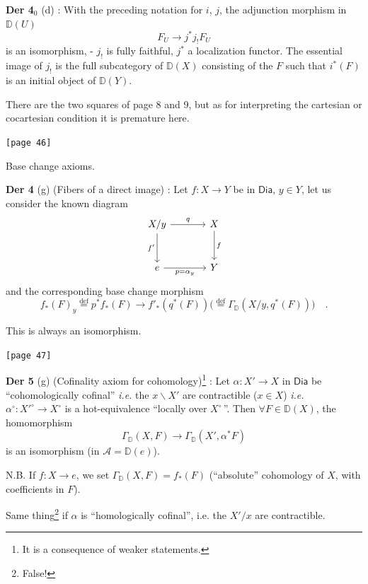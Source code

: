 \documentclass[11pt]{article}
\newcommand{\printedpage}[1]{\marginpar{\footnotesize p.~#1}}
\newcommand{\msp}[1]{\marginpar{\footnotesize [#1]}}
\newcommand{\D}{\mathbb{D}}
\newcommand{\Dia}{\mathsf{Dia}}
\begin{document}
\printedpage{25}

\noindent\textbf{Der 4}$_{0}$ (d) : With the preceding notation for $i$, $j$, the adjunction morphism in $\D(U)$
\[ F_{U} \longrightarrow j^{*} j_{!} F_{U} \]
is an isomorphism, - $j_{!}$ is fully faithful, $j^{*}$ a localization functor. The essential image of $j_{!}$ is the full subcategory of $\D(X)$ consisting of the $F$ such that $i^{*}(F)$ is an initial object of $\D(Y)$.

There are the two squares of page 8 and 9, but as for interpreting the cartesian or cocartesian condition it is premature here.

\noindent\msp{page 46}\texttt{[page 46]}

\noindent Base change axioms.

\noindent\textbf{Der 4} (g) (Fibers of a direct image) : Let $f : X \to Y$ be in $\Dia$, $y \in Y$, let us consider the known diagram
\[
\begin{tikzcd}[row sep=large, column sep=large]
X/y \arrow[r, "q"] \arrow[d, "f'"'] & X \arrow[d, "f"] \\
e \arrow[r, "p = \alpha_{y}"'] & Y
\end{tikzcd}
\]
and the corresponding base change morphism
\[ f_{*}(F)_{y} \overset{\text{def}}{=} p^{*} f_{*}(F) \longrightarrow f'_{*}(q^{*}(F))\bigl(\overset{\text{def}}{=} \Gamma_{\D}(X/y, q^{*}(F))\bigr) \quad . \]

\noindent This is always an isomorphism.

\noindent\msp{page 47}\texttt{[page 47]}

\noindent\textbf{Der 5} (g) (Cofinality axiom for cohomology)\footnote[14]{It is a consequence of weaker statements.} : Let $\alpha : X' \to X$ in $\Dia$ be ``cohomologically cofinal'' \textit{i.e.} the $x\backslash X'$ are contractible ($x \in X$) \textit{i.e.} $\alpha^{\circ} : {X'}^{\circ} \to X^{\circ}$ is a hot-equivalence ``locally over $X^{\circ}$\,''. Then $\forall F \in \D(X)$, the homomorphism
\[ \Gamma_{\D}(X, F) \longrightarrow \Gamma_{\D}(X', \alpha^{*} F) \]
is an isomorphism (in $\mathcal{A} = \D(e)$).

\noindent N.B. If $f : X \to e$, we set $\Gamma_{\D}(X, F) = f_{*}(F)$ (``absolute'' cohomology of $X$, with coefficients in $F$).

\noindent Same thing\footnote[15]{False!} if $\alpha$ is ``homologically cofinal'', i.e. the $X'/x$ are contractible.


\printedpage{26}
\end{document}
